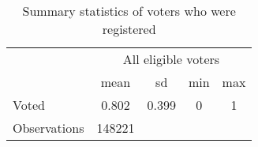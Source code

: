 \begin{table}[htbp]\centering
\def\sym#1{\ifmmode^{#1}\else\(^{#1}\)\fi}
\caption{Summary statistics of voters who were registered}
\begin{tabular}{l*{1}{cccc}}
\toprule
                &\multicolumn{4}{c}{All eligible voters}\\
                &     mean&       sd&      min&      max\\
\midrule
Voted           &    0.802&    0.399&        0&        1\\
\midrule
Observations    &   148221&         &         &         \\
\bottomrule
\end{tabular}
\end{table}
